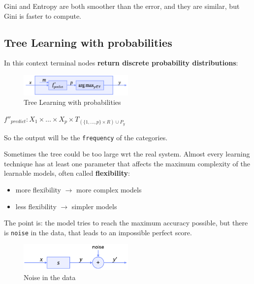 Gini and Entropy are both smoother than the error, and they are similar, but Gini is faster to compute.

\subsection{Tree Learning with probabilities}

In this context terminal nodes \textbf{return discrete probability distributions}:

\begin{center}
    \begin{figure}[H]
        \centering
        \includegraphics[width=0.5\textwidth]{assets/fig15.png}
        \caption{Tree Learning with probabilities}
    \end{figure}
\end{center}

\begin{center}
    $f''_{predict} : X_1 \times \dots \times X_p \times T_{(\{1, \dots, p\} \times R)\cup P_y}$
\end{center}

So the output will be the \texttt{frequency} of the categories.

\begin{warningblock}
    Sometimes the tree could be too large wrt the real system. Almost every learning technique has at least one parameter that affects the maximum complexity of the learnable models, often called \textbf{flexibility}:
    \begin{itemize}
        \item more flexibility $\to$ more complex models
        \item less flexibility $\to$ simpler models
    \end{itemize}
\end{warningblock}

The point is: the model tries to reach the maximum accuracy possible, but there is \texttt{noise} in the data, that leads to an impossible perfect score. 

\begin{center}
    \begin{figure}[H]
        \centering
        \includegraphics[width=0.5\textwidth]{assets/fig16.png}
        \caption{Noise in the data}
    \end{figure}
\end{center}

